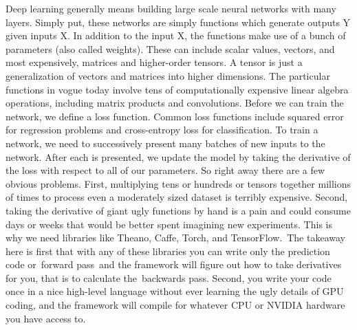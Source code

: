 Deep learning generally means building large scale neural networks with many layers. Simply put, these networks are simply functions which generate outputs Y given inputs X. In addition to the input X, the functions make use of a bunch of parameters (also called weights). These can include scalar values, vectors, and most expensively, matrices and higher-order tensors. A tensor is just a generalization of vectors and matrices into higher dimensions. The particular functions in vogue today involve tens of computationally expensive linear algebra operations, including matrix products and convolutions. Before we can train the network, we define a loss function. Common loss functions include squared error for regression problems and cross-entropy loss for classification. To train a network, we need to successively present many batches of new inputs to the network. After each is presented, we update the model by taking the derivative of the loss with respect to all of our parameters. So right away there are a few obvious problems. First, multiplying tens or hundreds or tensors together millions of times to process even a moderately sized dataset is terribly expensive. Second, taking the derivative of giant ugly functions by hand is a pain and could consume days or weeks that would be better spent imagining new experiments. This is why we need libraries like Theano, Caffe, Torch, and TensorFlow. The takeaway here is first that with any of these libraries you can write only the prediction code or forward pass and the framework will figure out how to take derivatives for you, that is to calculate the backwards pass. Second, you write your code once in a nice high-level language without ever learning the ugly details of GPU coding, and the framework will compile for whatever CPU or NVIDIA hardware you have access to.


